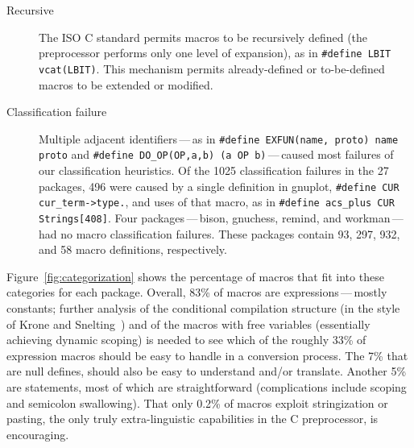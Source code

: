 \documentclass[11pt]{article}
\def\numpackages{27}
\begin{document}
\begin{description}
\item[Recursive]  The ISO C standard permits macros to be recursively
  defined (the preprocessor performs only one level of expansion), as in
  {\tt \#define LBIT vcat(LBIT)}.  This mechanism permits already-defined
  or to-be-defined macros to be extended or modified.

\item[Classification failure]  Multiple adjacent identifiers\,---\,as in
  {\tt \#define EXFUN(name, proto) name proto} and {\tt \#define
  \verb|DO_OP|(OP,a,b) (a OP b)}\,---\,caused most failures of our
classification heuristics.  Of the 1025 classification failures in the
{\numpackages} packages, 496 were caused by a single definition in gnuplot,
{\tt \#define CUR \verb|cur_term->type.|}, and uses of that macro, as in
{\tt \#define \verb|acs_plus| CUR Strings[408]}.  Four
packages\,---\,bison, gnuchess, remind, and workman\,---\,had no macro
classification failures.  These packages contain 93, 297, 932, and 58 macro
definitions, respectively.



\end{description}


Figure~\ref{fig:categorization} shows the percentage of macros that fit
into these categories for each package.  Overall, 83\% of macros are
expressions\,---\,mostly constants; further analysis of the conditional
compilation structure (in the style of Krone and Snelting~\cite{Krone94})
and of the macros with free variables (essentially achieving dynamic
scoping) is needed to see which of the roughly 33\% of expression macros
should be easy to handle in a conversion process.  The 7\% that are null
defines, should also be easy to understand and/or translate.  Another 5\%
are statements, most of which are straightforward (complications include
scoping and semicolon swallowing).  That only 0.2\% of macros exploit
stringization or pasting, the only truly extra-linguistic capabilities in
the C preprocessor, is encouraging.
\end{document}
